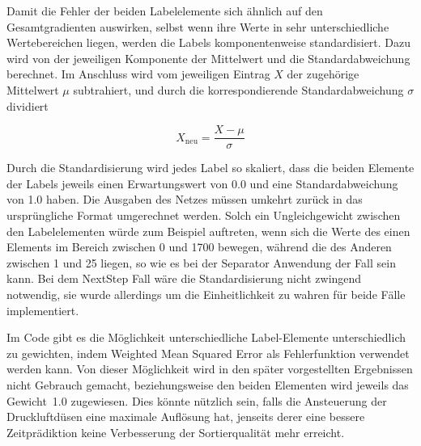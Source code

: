 Damit die Fehler der beiden Labelelemente sich ähnlich auf den Gesamtgradienten auswirken,
selbst wenn ihre Werte in sehr unterschiedliche Wertebereichen liegen, werden die Labels komponentenweise standardisiert.
Dazu wird von der jeweiligen Komponente der Mittelwert und die Standardabweichung berechnet. 
Im Anschluss wird vom jeweiligen Eintrag \(X\) der zugehörige Mittelwert \(\mu\) subtrahiert, und durch die korrespondierende Standardabweichung \(\sigma\) dividiert
	
\begin{equation*}
	X_{\text{neu}} = \frac{X - \mu}{\sigma} %
\end{equation*}

Durch die Standardisierung wird jedes Label so skaliert, dass die beiden Elemente der Labels jeweils einen Erwartungswert von 0.0 und eine Standardabweichung von 1.0 haben.
Die Ausgaben des Netzes müssen umkehrt zurück in das ursprüngliche Format umgerechnet werden.
Solch ein Ungleichgewicht zwischen den Labelelementen würde zum Beispiel auftreten, wenn sich die Werte des einen Elements im Bereich zwischen 0 und 1700 bewegen, während die des Anderen zwischen 1 und 25 liegen,
so wie es bei der Separator Anwendung der Fall sein kann.   
Bei dem NextStep Fall wäre die Standardisierung nicht zwingend notwendig, 
sie wurde allerdings um die Einheitlichkeit zu wahren für beide Fälle implementiert. 

Im Code gibt es die Möglichkeit unterschiedliche Label-Elemente unterschiedlich zu gewichten, indem Weighted Mean Squared Error als Fehlerfunktion verwendet werden kann. 
Von dieser Möglichkeit wird in den später vorgestellten Ergebnissen nicht Gebrauch gemacht, beziehungsweise den beiden Elementen wird jeweils das Gewicht~1.0 zugewiesen.
Dies könnte nützlich sein, falls die Ansteuerung der Druckluftdüsen eine maximale Auflösung hat, jenseits derer eine bessere Zeitprädiktion keine Verbesserung der Sortierqualität mehr erreicht.





